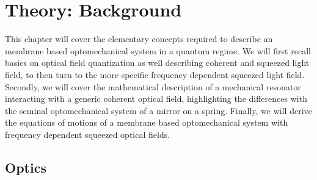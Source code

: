\newcommand{\adag}[1]{\hat{a}_{#1}^\dagger}
\newcommand{\aop}[1]{\hat{a}_{#1\vphantom{\dagger}}}
\chapter{Theory: Background}
This chapter will cover the elementary concepts required to describe an membrane based optomechanical system in a quantum regime. We will first recall basics on optical field quantization as well describing coherent and squeezed light field, to then turn to the more specific frequency dependent squeezed light field. Secondly, we will cover the mathematical description of a mechanical resonator interacting with a generic coherent optical field, highlighting the differences with the seminal optomechanical system of a mirror on a spring. Finally, we will derive the equations of motions of a membrane based optomechanical system with frequency dependent squeezed optical fields. 
\newpage
\minitoc
\newpage
\section{Optics}
